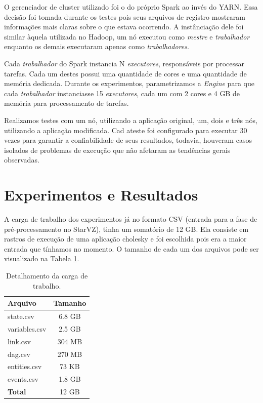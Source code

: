 O gerenciador de cluster utilizado foi o do próprio Spark ao invés do YARN. 
Essa decisão foi tomada durante os testes pois seus arquivos de registro 
mostraram informações mais claras sobre o que estava ocorrendo. A instânciação 
dele foi similar àquela utilizada no Hadoop, um nó executou como \emph{mestre} 
e \emph{trabalhador} enquanto os demais executaram apenas como 
\emph{trabalhadores}. 

Cada \emph{trabalhador} do Spark instancia N \emph{executores}, responsáveis 
por processar tarefas. Cada um destes possui uma quantidade de cores e uma 
quantidade de memória dedicada. Durante os experimentos, parametrizamos a 
\emph{Engine} para que cada \emph{trabalhador} instanciasse 15 
\emph{executores}, cada um com 2 cores e 4 GB de memória para processamento de 
tarefas.

Realizamos testes com um nó, utilizando a aplicação original, um, dois e três 
nós, utilizando a aplicação modificada. Cad ateste foi configurado para 
executar 30 vezes para garantir a confiabilidade de seus resultados, todavia, 
houveram casos isolados de problemas de execução que não afetaram as tendências 
gerais observadas.


\section{Experimentos e Resultados} \label{sect:results}

A carga de trabalho dos experimentos já no formato CSV (entrada para a fase de 
pré-processamento no StarVZ), tinha um somatório de 12 GB. Ela consiste em 
rastros de execução de uma aplicação cholesky e foi escolhida pois era a maior
entrada que tínhamos no momento. O tamanho de cada um dos arquivos pode ser 
visualizado na Tabela \ref{tab:input_sz}.

\begin{table}[H]
\centering
\small
\begin{tabular}{l c} \toprule
\textbf{Arquivo}  &  \textbf{Tamanho} \\ 
\midrule
state.csv	& 6.8 GB \\
variables.csv  	& 2.5 GB \\
link.csv       	& 304 MB \\
dag.csv        	& 270 MB \\
entities.csv	& 73 KB \\
events.csv	& 1.8 GB \\
\textbf{Total}  & 12 GB  \\
\end{tabular}
\caption{Detalhamento da carga de trabalho.}
\label{tab:input_sz}
\end{table}

